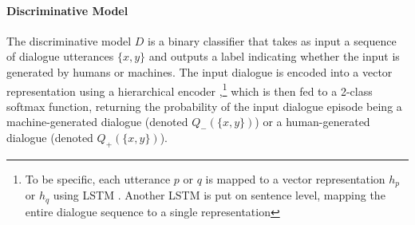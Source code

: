 \paragraph{Discriminative Model} The discriminative model $D$ is a binary classifier that takes as input a sequence of dialogue utterances $\{x,y\}$
 and outputs a label indicating whether the input is generated by humans or machines.  
The input dialogue is encoded into a vector representation 
using a hierarchical encoder  \cite{li2015hierarchical,serban2016building},\footnote{To be specific, each utterance $p$ or $q$ is mapped to a vector representation $h_p$ or $h_q$ using LSTM \cite{hochreiter1997long}.
Another LSTM is put on sentence level, mapping the entire dialogue sequence to a single representation} which is then fed to a 2-class softmax function, returning the probability of the input dialogue episode being a machine-generated dialogue
(denoted $Q_-(\{x,y\})$)
 or a human-generated dialogue  (denoted $Q_+(\{x,y\})$). 
